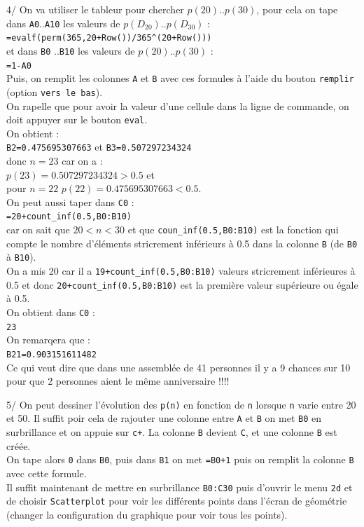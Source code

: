 \documentclass[a4paper,11pt]{book}
\begin{document}
4/ On va utiliser le tableur pour chercher $p(20)..p(30)$, pour cela on tape 
dans {\tt A0}..{\tt A10} les valeurs de $p(D_ {20})..p(D_ {30})$ :\\
 {\tt =evalf(perm(365,20+Row())/365\verb|^|(20+Row()))}\\
et dans {\tt B0} ..{\tt B10} les valeurs de $p(20)..p(30)$ :\\
 {\tt =1-A0}\\
Puis, on remplit les colonnes {\tt A} et {\tt B} avec ces formules \`a l'aide
du bouton {\tt remplir} (option {\tt vers le bas}).\\
On rapelle que pour avoir la valeur d'une cellule dans la ligne de commande,
on doit appuyer sur le bouton {\tt eval}.\\
On obtient :\\
{\tt B2=0.475695307663} et {\tt B3=0.507297234324}\\
donc $n=23$ car on a :\\
$p(23)=0.507297234324>0.5$ et\\
pour $n=22$ $p(22)=0.475695307663<0.5$.\\
On peut aussi taper dans {\tt C0} :\\
{\tt =20+count\_inf(0.5,B0:B10)} \\
car on sait que $20<n<30$  et que {\tt coun\_inf(0.5,B0:B10)} est la fonction 
qui compte le nombre d'\'el\'ements stricrement inf\'erieurs \`a 0.5 dans la 
colonne {\tt B} (de {\tt B0} \`a {\tt B10}).\\
 On a mis 20 car il a {\tt 19+count\_inf(0.5,B0:B10)} valeurs stricrement 
inf\'erieures \`a 0.5 et donc {\tt 20+count\_inf(0.5,B0:B10)} est la 
premi\`ere valeur sup\'erieure ou \'egale  \`a 0.5.\\
On obtient dans {\tt C0} :\\
{\tt 23}\\
On remarqera que :\\
{\tt B21=0.903151611482}\\
Ce qui veut dire que dans une assembl\'ee de 41 personnes il y a 9 chances sur 
10 pour que 2 personnes aient le m\^eme anniversaire !!!!

5/ On peut dessiner l'\'evolution des {\tt p(n)} en fonction de {\tt n} lorsque
{\tt n} varie entre 20 et 50.
Il suffit poir cela de rajouter une colonne entre 
{\tt A} et {\tt B} on met {\tt B0}  en surbrillance et on appuie sur 
{\tt c+}. La colonne {\tt B} devient {\tt C}, et une colonne {\tt B} est 
cr\'e\'ee. \\
On tape alors {\tt 0} dans {\tt B0}, puis dans {\tt B1} on met
{\tt =B0+1} puis on remplit la colonne {\tt B} avec cette formule.\\
Il suffit maintenant de mettre en surbrillance {\tt B0:C30} puis d'ouvrir le 
menu {\tt 2d} et de choisir {\tt Scatterplot} pour voir les diff\'erents 
points dans l'\'ecran de g\'eom\'etrie (changer la configuration du 
graphique pour voir tous les points).
\end{document}

